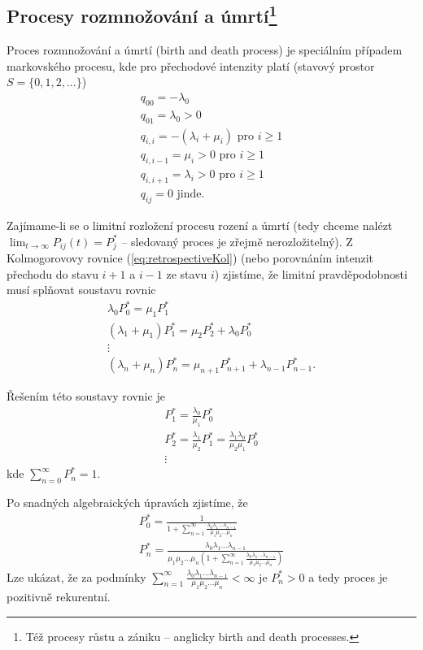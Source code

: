 \documentclass[10pt]{article}
\begin{document}
\subsection[Procesy rozmnožování a úmrtí]{Procesy rozmnožování a úmrtí\footnote{Též procesy růstu a zániku -- anglicky birth and death processes.}
}
Proces rozmnožování a úmrtí (birth and death process) je speciálním případem markovského procesu, kde pro přechodové intenzity platí (stavový prostor $S=\{0,1,2,...\}$)
\begin{gather*}
q_{00} = -\lambda_0\\
q_{01} = \lambda_0 >0\\
q_{i,i} = -(\lambda_i+\mu_i) \text{ pro }i \geq 1\\
q_{i,i-1} = \mu_i>0 \text{ pro }i \geq 1\\
q_{i,i+1} = \lambda_i > 0 \text{ pro }i \geq 1\\
q_{ij} = 0 \text{ jinde.}
\end{gather*}

Zajímame-li se o limitní rozložení procesu rození a úmrtí (tedy chceme nalézt $\lim_{t \to \infty} P_{ij}(t) = P_j^*$ -- sledovaný proces je zřejmě nerozložitelný). Z Kolmogorovovy rovnice (\ref{eq:retrospectiveKol}) (nebo porovnáním intenzit přechodu do stavu $i+1$ a $i-1$ ze stavu $i$) zjistíme, že limitní pravděpodobnosti musí splňovat soustavu rovnic
\begin{gather*}
\lambda_0 P_0^* = \mu_1 P_1^*\\
(\lambda_1 + \mu_1)P_1^* = \mu_2 P^*_2 + \lambda_0 P_0^*\\
\vdots\\
(\lambda_n + \mu_n)P_n^* = \mu_{n+1}P_{n+1}^*+\lambda_{n-1}P_{n-1}^*.
\end{gather*}

Řešením této soustavy rovnic je 
\begin{gather*}
P_1^* = \frac{\lambda_0}{\mu_1} P_0^*\\
P_2^* = \frac{\lambda_1}{\mu_2} P_1^* = \frac{\lambda_1 \lambda_0}{\mu_2 \mu_1} P_0^* \\
\vdots
\end{gather*}
kde $\sum_{n=0}^\infty P_n^*=1$.

Po snadných algebraických úpravách zjistíme, že 
\begin{gather*}
P_0^* = \frac{1}{1+\sum_{n=1}^\infty \frac{\lambda_0 \lambda_1 ... \lambda_{n-1}}{\mu_1 \mu_2 ... \mu_n }}\\
P^*_n = \frac{\lambda_0 \lambda_1 ... \lambda_{n-1}}{\mu_1 \mu_2 ... \mu_n (1+\sum_{n=1}^\infty \frac{\lambda_0 \lambda_1 ... \lambda_{n-1}}{\mu_1 \mu_2 ... \mu_n }) }
\end{gather*}
Lze ukázat, že za podmínky $\sum_{n=1}^\infty \frac{\lambda_0 \lambda_1 ... \lambda_{n-1}}{\mu_1 \mu_2 ... \mu_n }<\infty$ je $P^*_n > 0$ a tedy proces je pozitivně rekurentní.
\end{document}
